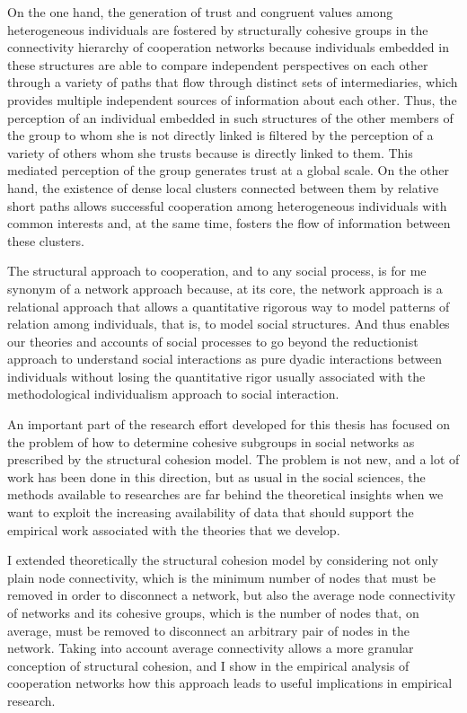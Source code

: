 On the one hand, the generation of trust and congruent values among heterogeneous individuals are fostered by structurally cohesive groups in the connectivity hierarchy of cooperation networks because individuals embedded in these structures are able to compare independent perspectives on each other through a variety of paths that flow through distinct sets of intermediaries, which provides multiple independent sources of information about each other. Thus, the perception of an individual embedded in such structures of the other members of the group to whom she is not directly linked is filtered by the perception of a variety of others whom she trusts because is directly linked to them. This mediated perception of the group generates trust at a global scale. On the other hand, the existence of dense local clusters connected between them by relative short paths allows successful cooperation among heterogeneous individuals with common interests and, at the same time, fosters the flow of information between these clusters.

The structural approach to cooperation, and to any social process, is for me synonym of a network approach because, at its core, the network approach is a relational approach that allows a quantitative rigorous way to model patterns of relation among individuals, that is, to model social structures. And thus enables our theories and accounts of social processes to go beyond the reductionist approach to understand social interactions as pure dyadic interactions between individuals without losing the quantitative rigor usually associated with the methodological individualism approach to social interaction.

An important part of the research effort developed for this thesis has focused on the problem of how to determine cohesive subgroups in social networks as prescribed by the structural cohesion model. The problem is not new, and a lot of work has been done in this direction, but as usual in the social sciences, the methods available to researches are far behind the theoretical insights when we want to exploit the increasing availability of data that should support the empirical work associated with the theories that we develop.

I extended theoretically the structural cohesion model by considering not only plain node connectivity, which is the minimum number of nodes that must be removed in order to disconnect a network, but also the average node connectivity of networks and its cohesive groups, which is the number of nodes that, on average, must be removed to disconnect an arbitrary pair of nodes in the network. Taking into account average connectivity allows a more granular conception of structural cohesion, and I show in the empirical analysis of cooperation networks how this approach leads to useful implications in empirical research.

